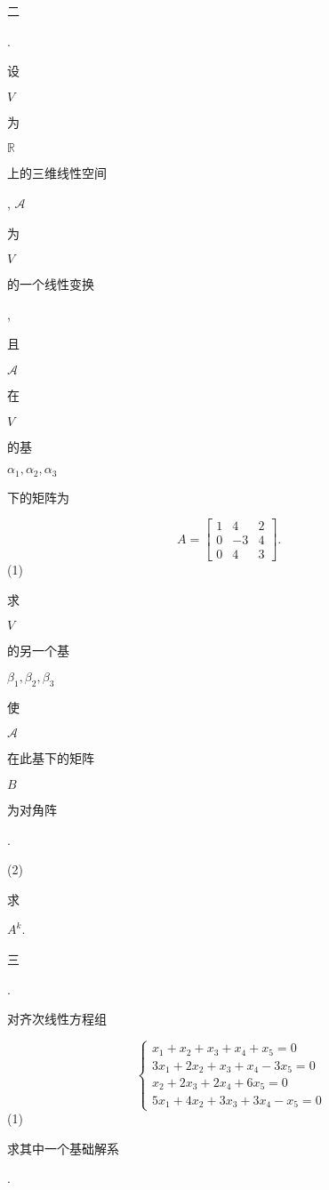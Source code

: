 \documentclass[10pt]{article}
\begin{document}
\begin{CJK}{UTF8}{mj}二\end{CJK}. \begin{CJK}{UTF8}{mj}设\end{CJK} $V$ \begin{CJK}{UTF8}{mj}为\end{CJK} $\mathbb{R}$ \begin{CJK}{UTF8}{mj}上的三维线性空间\end{CJK}, $\mathscr{A}$ \begin{CJK}{UTF8}{mj}为\end{CJK} $V$ \begin{CJK}{UTF8}{mj}的一个线性变换\end{CJK}, \begin{CJK}{UTF8}{mj}且\end{CJK} $\mathscr{A}$ \begin{CJK}{UTF8}{mj}在\end{CJK} $V$ \begin{CJK}{UTF8}{mj}的基\end{CJK} $\alpha_{1}, \alpha_{2}, \alpha_{3}$ \begin{CJK}{UTF8}{mj}下的矩阵为\end{CJK}
$$
A=\left[\begin{array}{ccc}
1 & 4 & 2 \\
0 & -3 & 4 \\
0 & 4 & 3
\end{array}\right] \text {. }
$$
(1) \begin{CJK}{UTF8}{mj}求\end{CJK} $V$ \begin{CJK}{UTF8}{mj}的另一个基\end{CJK} $\beta_{1}, \beta_{2}, \beta_{3}$ \begin{CJK}{UTF8}{mj}使\end{CJK} $\mathscr{A}$ \begin{CJK}{UTF8}{mj}在此基下的矩阵\end{CJK} $B$ \begin{CJK}{UTF8}{mj}为对角阵\end{CJK}.

(2) \begin{CJK}{UTF8}{mj}求\end{CJK} $A^{k}$.

\begin{CJK}{UTF8}{mj}三\end{CJK}. \begin{CJK}{UTF8}{mj}对齐次线性方程组\end{CJK}
$$
\left\{\begin{array}{l}
x_{1}+x_{2}+x_{3}+x_{4}+x_{5}=0 \\
3 x_{1}+2 x_{2}+x_{3}+x_{4}-3 x_{5}=0 \\
x_{2}+2 x_{3}+2 x_{4}+6 x_{5}=0 \\
5 x_{1}+4 x_{2}+3 x_{3}+3 x_{4}-x_{5}=0
\end{array}\right.
$$
(1) \begin{CJK}{UTF8}{mj}求其中一个基础解系\end{CJK}.
\end{document}
